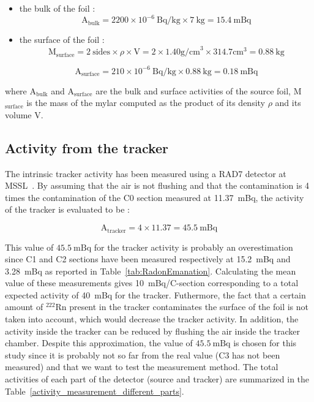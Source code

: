 \documentclass[main.tex]{subfiles}
\begin{document}
\begin{itemize}
\item the bulk of the foil :
\begin{equation}
\text{A}_{\text{bulk}} =  \text{2200} \times \text{10}^{-\text{6}}~ \text{Bq/kg} \times \text{7}~\text{kg} = \text{15.4}~\text{mBq} 
\end{equation}

\item the surface of the foil :
\begin{equation}
\text{M}_{\text{surface}} = \text{2}~\text{sides} \times \rho \times \text{V} = \text{2} \times \text{1.40} \text{g/cm}^\text{3} \times \text{314.7} \text{cm}^\text{3} = \text{0.88}~\text{kg}
\end{equation}

\begin{equation}
\text{A}_{\text{surface}} = \text{210} \times \text{10}^{-\text{6}}~\text{Bq/kg} \times \text{0.88}~\text{kg} = \text{0.18}~\text{mBq} 
\end{equation}
\end{itemize}


\NI where A$_{\text{bulk}}$ and A$_{\text{surface}}$ are the bulk and surface activities of the source foil, M$_{\text{surface}}$ is the mass of the mylar computed as the product of its density $\rho$ and its volume V.


\subsection{Activity from the tracker}\label{sec:ActivityTracker}


\noindent The intrinsic tracker activity has been measured using a RAD7 detector at MSSL~\cite{RAD7measurement}. By assuming that the air is not flushing and that the contamination is 4 times the contamination of the C0 section measured at 11.37~mBq, the activity of the tracker is evaluated to be : 


\begin{equation}
\text{A}_{\text{tracker}} =  \text{4} \times  \text{11.37} = \text{45.5}~\text{mBq} 
\end{equation}


\NI This value of $\text{45.5}~\text{mBq}$ for the tracker activity is probably an overestimation since C1 and C2 sections have been measured respectively at 15.2~mBq and 3.28~mBq as reported in Table~\ref{tab:RadonEmanation}. Calculating the mean value of these measurements gives 10~mBq/C-section corresponding to a total expected activity of 40~mBq for the tracker. Futhermore, the fact that a certain amount of $^{\text{222}}$Rn present in the tracker contaminates the surface of the foil is not taken into account, which would decrease the tracker activity. In addition, the activity inside the tracker can be reduced by flushing the air inside the tracker chamber. Despite this approximation, the value of $\text{45.5}~\text{mBq}$ is chosen for this study since it is probably not so far from the real value (C3 has not been measured) and that we want to test the measurement method. The total activities of each part of the detector (source and tracker) are summarized in the Table~\ref{activity_measurement_different_parts}.
\end{document}
